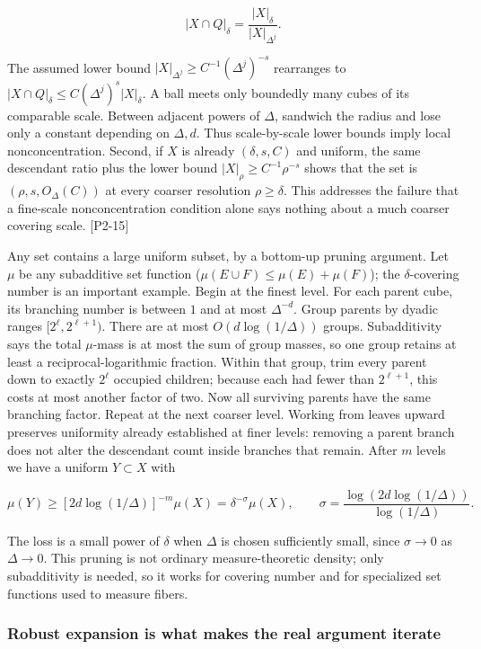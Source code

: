\[|X\cap Q|_\delta=\frac{|X|_\delta}{|X|_{\Delta^j}}.\]

The assumed lower bound \(|X|_{\Delta^j}\ge C^{-1}(\Delta^j)^{-s}\) rearranges to \(|X\cap Q|_\delta\le C(\Delta^j)^s|X|_\delta\). A ball meets only boundedly many cubes of its comparable scale. Between adjacent powers of \(\Delta\), sandwich the radius and lose only a constant depending on \(\Delta,d\). Thus scale-by-scale lower bounds imply local nonconcentration. Second, if \(X\) is already \((\delta,s,C)\) and uniform, the same descendant ratio plus the lower bound \(|X|_\rho\ge C^{-1}\rho^{-s}\) shows that the set is \((\rho,s,O_\Delta(C))\) at every coarser resolution \(\rho\ge\delta\). This addresses the failure that a fine-scale nonconcentration condition alone says nothing about a much coarser covering scale. {[}P2-15{]}

Any set contains a large uniform subset, by a bottom-up pruning argument. Let \(\mu\) be any subadditive set function (\(\mu(E\cup F)\le\mu(E)+\mu(F)\)); the \(\delta\)-covering number is an important example. Begin at the finest level. For each parent cube, its branching number is between \(1\) and at most \(\Delta^{-d}\). Group parents by dyadic ranges \([2^\ell,2^{\ell+1})\). There are at most \(O(d\log(1/\Delta))\) groups. Subadditivity says the total \(\mu\)-mass is at most the sum of group masses, so one group retains at least a reciprocal-logarithmic fraction. Within that group, trim every parent down to exactly \(2^\ell\) occupied children; because each had fewer than \(2^{\ell+1}\), this costs at most another factor of two. Now all surviving parents have the same branching factor. Repeat at the next coarser level. Working from leaves upward preserves uniformity already established at finer levels: removing a parent branch does not alter the descendant count inside branches that remain. After \(m\) levels we have a uniform \(Y\subset X\) with

\[\mu(Y)\ge [2d\log(1/\Delta)]^{-m}\mu(X)=\delta^{-\sigma}\mu(X),\qquad \sigma=\frac{\log(2d\log(1/\Delta))}{\log(1/\Delta)}.\]

The loss is a small power of \(\delta\) when \(\Delta\) is chosen sufficiently small, since \(\sigma\to0\) as \(\Delta\to0\). This pruning is not ordinary measure-theoretic density; only subadditivity is needed, so it works for covering number and for specialized set functions used to measure fibers.

\subsubsection{Robust expansion is what makes the real argument iterate}\label{04-visual-computing-ii-ch033-robust-expansion-is-what-makes-the-real-argument-iterate}

